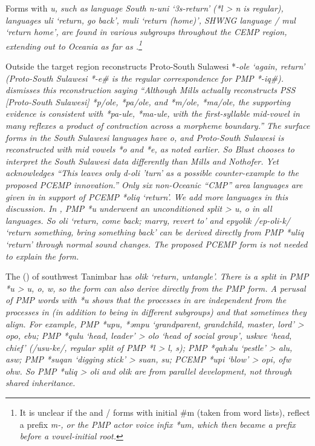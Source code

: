 Forms with \it{u}, such as  language South 
\it{n-uni} ‘3s-return’ (*l > \it{n} is regular),
 languages  \it{uli} ‘return,
go back’,  \it{muli} ‘return (home)’,
SHWNG language / \it{mul} ‘return home’,
are found in various subgroups throughout the CEMP region,
extending out to Oceania as far as .\footnote{
It is
unclear if the 
and / forms with initial {\#}m (taken from word lists),
reflect a  prefix \it{m-},
or the PMP actor voice infix *\<um\>,
which then became a prefix before a vowel-initial root.}

Outside the target region \citet[879]{Mills1975} reconstructs
Proto-South Sulawesi *\it{-ole} ‘again,
return’ (Proto-South Sulawesi *-e{\#} is the regular correspondence for PMP *-iq{\#}).
\citet[247]{Blust1993} dismisses this reconstruction saying “Although
Mills actually reconstructs PSS [Proto-South Sulawesi] *p/ole,
*pa/ole, and *m/ole, *ma/ole,
the supporting evidence is consistent with *pa-ule,
*ma-ule, with the first-syllable mid-vowel in many reflexes a
product of contraction across a morpheme boundary.” The surface
forms in the South Sulawesi languages have \it{o},
and Proto-South Sulawesi is reconstructed with mid vowels *o
and *e, as noted earlier.
So Blust chooses to interpret the South Sulawesi data differently
than Mills and Nothofer.
Yet \citet[247]{Blust1993} acknowledges “This leaves only 
\it{d-oli} 'turn' as a possible counter-example to the proposed
PCEMP innovation.” 
Only six non-Oceanic “CMP” area languages are given in \citet{Blust1993}
in support of PCEMP *oliq ‘return’.
We add more languages in this discussion.
In , PMP *u underwent an unconditioned split >
\it{u, o} in all  languages.
So  \it{oli} ‘return,
come back; marry, revert to’
and \it{epyolik} /ep-oli-k/ ‘return something,
bring something back’ \citep{GrimesB1990,GrimesGrimes2020} can be derived directly
from PMP *uliq ‘return’ through normal sound changes.
The proposed PCEMP form is not needed to explain the  form.

The  () of southwest Tanimbar
has \it{olik} ‘return, untangle’.
There is a split in PMP *u > \it{u,
o, w}, so the  form can also derive directly from the PMP form.
A perusal of PMP words with *u shows that the processes in 
are independent from the processes in  (in addition to being
in different subgroups) and that sometimes they align.
For example, PMP *upu,
*əmpu ‘grandparent, grandchild, master, lord’ >  \it{opo},
 \it{ebu}; PMP *qulu ‘head,
leader’ >  \it{olo} ‘head of social group’,
 \it{uskwe} ‘head, chief’ (/usu-ke/,
regular split of PMP *l > \it{l,
s}); PMP *qahəlu ‘pestle’ >  \it{alu},
 \it{asw}; PMP *suqan ‘digging stick’ >  \it{suan},
 \it{su}; PCEMP *upi ‘blow’ >  \it{opi},
 \it{ofw {\tl} ohw}.
So PMP *uliq >  \it{oli}
and  \it{olik} are from parallel development,
not through shared inheritance.

